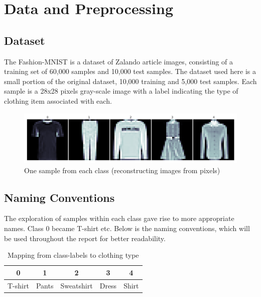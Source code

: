 \section{Data and Preprocessing}
\subsection{Dataset}
The Fashion-MNIST is a dataset of Zalando article images, consisting of a training set of 60,000 samples and 10,000 test samples.
The dataset used here is a small portion of the original dataset, 10,000 training and 5,000 test samples.
Each sample is a 28x28 pixels gray-scale image with a label indicating the type of clothing item associated with each.
\newline

\begin{figure}[ht]
\centering
\includegraphics[scale=0.45]{figures_for_report/samples_from_classes}
\captionsetup{justification=centering,margin=2cm}
\caption{One sample from each class (reconstructing images from pixels)}
\end{figure}
\subsection{Naming Conventions}
The exploration of samples within each class gave rise to more appropriate names.
Class 0 became T-shirt etc.
Below is the naming conventions, which will be used throughout the report for better readability.  \\
\begin{table}[!ht]
  \footnotesize
  \centering
\begin{tabular}{ c c c c c }
 \toprule
 \textbf{0} & \textbf{1} & \textbf{2} & \textbf{3} & \textbf{4} \\ 
 \midrule 
 T-shirt & Pants & Sweatshirt & Dress & Shirt \\ 
 \bottomrule
\end{tabular} \\[0.2cm]
\captionsetup{justification=centering,margin=2cm}
\caption{Mapping from class-labels to clothing type}
\label{features}
\end{table}


